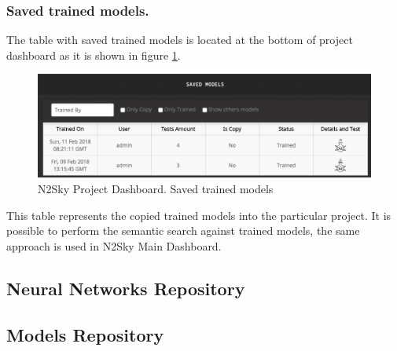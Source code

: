 \begin{itemize}
\subsubsection{Saved trained models.}

The table with saved trained models is located at the bottom of project dashboard as it is shown in figure \ref{fig:saved_trained_models_project}.

\begin{figure}[htbp]
\begin{center}
  \includegraphics[width=\linewidth]{components/5/img/saved_trained_models_project.png}
  \caption{N2Sky Project Dashboard. Saved trained models}
  \label{fig:saved_trained_models_project}
\end{center}
\end{figure}

This table represents the copied trained models into the particular project. It is possible to perform the semantic search against trained models, the same approach is used in N2Sky Main Dashboard. 

\end{itemize}


\subsection{Neural Networks Repository}\label{Neural Networks Repository}
\subsection{Models Repository}\label{Models Repository}
